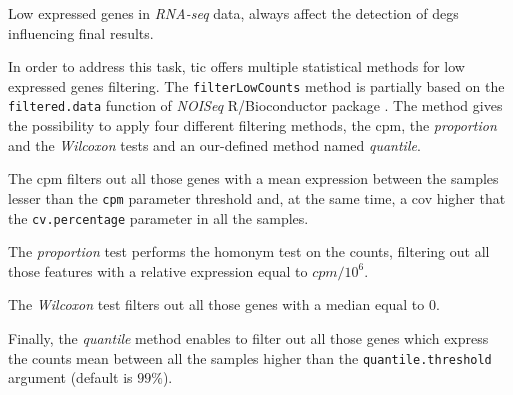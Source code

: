 Low expressed genes in \textit{RNA-seq} data, always affect the detection of \glspl{deg} \cite{Sha2015} influencing final results.

In order to address this task, \gls{tic} offers multiple statistical methods for low expressed genes filtering. 
The \lstinline!filterLowCounts! method is partially based on the \lstinline!filtered.data!  function of \textit{NOISeq} R/Bioconductor package \cite{Tarazona2012}. 
The method gives the possibility to apply four different filtering methods, the \gls{cpm}, the \textit{proportion} and the \textit{Wilcoxon} tests and an our-defined method named \textit{quantile}.

The \gls{cpm} filters out all those genes with a mean expression between the samples lesser than the \lstinline!cpm! parameter threshold and, at the same time, a \gls{cov} higher that the \lstinline!cv.percentage! parameter in all the samples.

The \textit{proportion} test performs the homonym test on the counts, filtering out all those features with a relative expression equal to $cpm/10^6$.

The \textit{Wilcoxon} test filters out all those genes with a median equal to $0$.

Finally, the \textit{quantile} method enables to filter out all those genes which express the counts mean between all the samples higher than the \lstinline!quantile.threshold! argument (default is $99\%$).